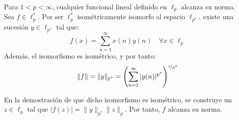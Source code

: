 \begin{ejercicio}
Para $1 < p < \infty$, cualquier funcional lineal definido en $\ell_p$ alcanza su norma.\\

Sea $f \in \ell_p^*$. Por ser $\ell_p^*$ isométricamente isomorfo al espacio  $\ell_{p^*}$, existe una sucesión $y \in \ell_{p^*}$ tal que:
\begin{equation*}
    f(x) = \sum_{n=1}^{\infty} x(n) y(n) \quad \forall x \in \ell_p
\end{equation*}
Además, el isomorfismo es isométrico, y por tanto:
\begin{equation*}
    \|f\| = \|y\|_{p^*} = \left(\sum_{n=1}^{\infty} |y(n)|^{p^*}\right)^{\nicefrac{1}{p^*}}
\end{equation*}

En la demostración de que dicho isomorfismo es isométrico, se construye un $z\in \ell_p$ tal que $|f(z)| = \|y\|_{p^*} \|z\|_p$. Por tanto, $f$ alcanza su norma.
\end{ejercicio}

